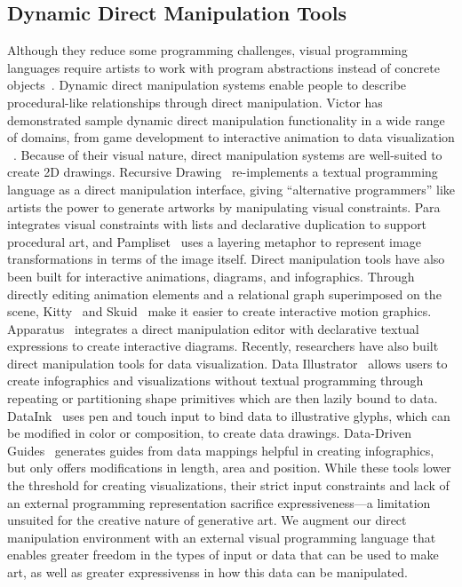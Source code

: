 \documentclass{sigchi}
\begin{document}
\subsection{Dynamic Direct Manipulation Tools}
Although they reduce some programming challenges, visual programming languages require artists to work with program abstractions instead of concrete objects~\cite{victor}. Dynamic direct manipulation systems enable people to describe procedural-like relationships through direct  manipulation. Victor has demonstrated sample dynamic direct manipulation functionality in a wide range of domains, from game development to interactive animation to data visualization ~\cite{inventing_on_principle,victor:dead_fish,victor:dynamic_data_viz}. Because of their visual nature, direct manipulation systems are well-suited to create 2D drawings. Recursive Drawing~\cite{schachman} re-implements a textual programming language as a direct manipulation interface, giving ``alternative programmers'' like artists the power to generate artworks by manipulating visual constraints. Para~\cite{Jacobs:2017:SEP:3025453.3025927} integrates visual constraints with lists and declarative duplication to support procedural art, and Pampliset~\cite{blackwell} uses a layering metaphor to represent image transformations in terms of the image itself. %
Direct manipulation tools have also been built for interactive animations, diagrams, and infographics. Through directly editing animation elements and a relational graph superimposed on the scene, Kitty~\cite{kitty} and Skuid~\cite{skuid} make it easier to create interactive motion graphics. Apparatus~\cite{apparatus} integrates a direct manipulation editor with declarative textual expressions to create interactive diagrams. Recently, researchers have also built direct manipulation tools for data visualization. Data Illustrator~\cite{dataillus} allows users to create infographics and visualizations without textual programming through repeating or partitioning shape primitives which are then lazily bound to data. DataInk~\cite{dataink} uses pen and touch input to bind data to illustrative glyphs, which can be modified in color or composition, to create data drawings. Data-Driven Guides~\cite{kim2017data} generates guides from data mappings helpful in creating infographics, but only offers modifications in length, area and position. While these tools lower the threshold for creating visualizations, their strict input constraints and lack of an external programming representation sacrifice expressiveness---a limitation unsuited for the creative nature of generative art. We augment our direct manipulation environment with an external visual programming language that enables greater freedom in the types of input or data that can be used to make art, as well as greater expressivenss in how this data can be manipulated. %
\end{document}
